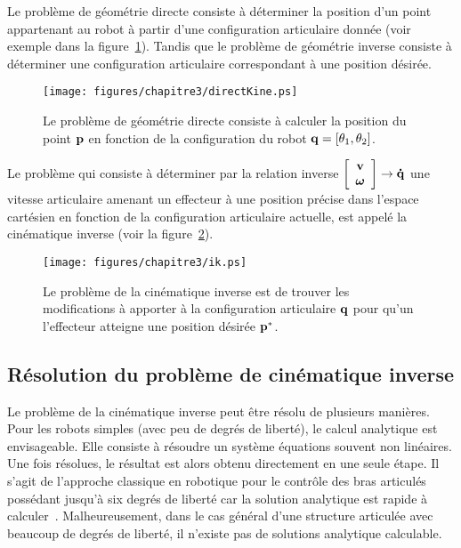 Le problème de géométrie directe consiste à déterminer
la position d'un point appartenant au robot à partir d'une configuration
articulaire donnée (voir exemple dans la figure~\ref{fig:directKine}).
Tandis que le problème de géométrie inverse consiste à déterminer
une configuration articulaire correspondant à une position désirée.
\begin{figure}[t]
  \begin{center}
    \texttt{[image: figures/chapitre3/directKine.ps]}
  \end{center}
  \caption[Géométrie directe.]{Le problème de géométrie directe consiste à calculer 
  la position du point ${\mathbf{p}}$ en fonction de la configuration du robot
  ${\mathbf{q}} = [\theta_1, \theta_2]$.}
  \label{fig:directKine}
\end{figure}
Le problème qui consiste à déterminer par la relation inverse 
$\left[ \begin{array}{cc}
  {\mathbf{v}}\\
  \boldsymbol\omega
\end{array}
\right] 
  \rightarrow {\mathbf{\dot{q}}}$ 
une vitesse articulaire 
amenant un effecteur à une position précise dans l'espace cartésien en fonction de la configuration
articulaire actuelle, est
appelé la cinématique inverse (voir la figure~\ref{fig:ik}). 
\begin{figure}[t]
  \begin{center}
    \texttt{[image: figures/chapitre3/ik.ps]}
  \end{center}
  \caption[Cinématique inverse.]{Le problème de la cinématique inverse est de trouver les modifications à apporter
  à la configuration articulaire ${\mathbf{q}}$ pour qu'un l'effecteur atteigne une position désirée ${\mathbf{p}}^*$.}
  \label{fig:ik}
\end{figure}

\subsection{Résolution du problème de cinématique inverse}
Le problème de la cinématique inverse peut être résolu de plusieurs manières.
Pour les robots simples (avec peu de degrés de liberté), le calcul analytique est envisageable. Elle consiste à 
résoudre un système équations souvent non linéaires. Une fois résolues, le résultat est alors obtenu
directement en une seule étape. Il s'agit de l'approche classique
en robotique pour le contrôle des bras articulés possédant jusqu'à 
six degrés de liberté car la solution analytique est rapide à calculer~\cite{craig04}.
Malheureusement, dans le cas général d'une structure articulée avec beaucoup de degrés
de liberté, il n'existe pas de solutions analytique
calculable.

